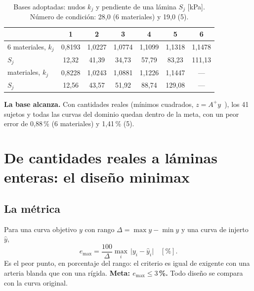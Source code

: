 \begin{table}[tb]\centering\small
\caption{Bases adoptadas: nudos $k_j$ y pendiente de una lámina $S_j$ [kPa]. Número de condición: 28,0 (6 materiales) y 19,0 (5).}\label{tab:bases}
\begin{tabular}{lcccccc}\toprule
 & 1 & 2 & 3 & 4 & 5 & 6\\\midrule
6 materiales, $k_j$ & 0,8193 & 1,0227 & 1,0774 & 1,1099 & 1,1318 & 1,1478\\
\phantom{6 materiales, }$S_j$ & 12,32 & 41,39 & 34,73 & 57,79 & 83,23 & 111,13\\\addlinespace
5 materiales, $k_j$ & 0,8228 & 1,0243 & 1,0881 & 1,1226 & 1,1447 & ---\\
\phantom{5 materiales, }$S_j$ & 12,56 & 43,57 & 51,92 & 88,74 & 129,08 & ---\\\bottomrule
\end{tabular}
\end{table}

\textbf{La base alcanza.} Con cantidades reales (mínimos cuadrados, $z=A^+y$~\cite{penrose,golub}), los 41 sujetos y todas las curvas del dominio quedan dentro de la meta, con un peor error de 0,88\,\% (6 materiales) y 1,41\,\% (5).

\section{De cantidades reales a láminas enteras: el diseño minimax}
\subsection{La métrica}
Para una curva objetivo $y$ con rango $\Delta=\max y-\min y$ y una curva de injerto $\hat y$,
\begin{equation}\label{eq:emax}
e_{\max}=\frac{100}{\Delta}\max_i\,\lvert y_i-\hat y_i\rvert\quad[\%].
\end{equation}
Es el peor punto, en porcentaje del rango: el criterio es igual de exigente con una arteria blanda que con una rígida. \textbf{Meta: $e_{\max}\le3$\,\%.} Todo diseño se compara con la curva original.

